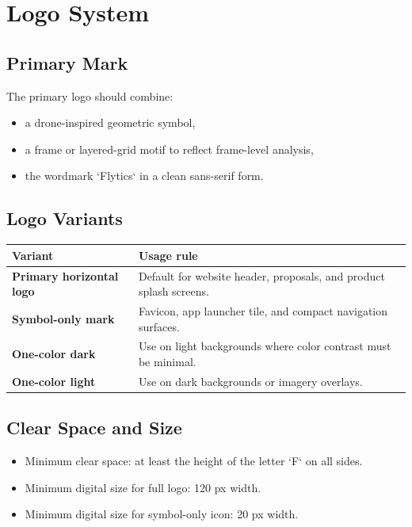 \documentclass[11pt,a4paper]{article}
\begin{document}
\section{Logo System}

\subsection{Primary Mark}

The primary logo should combine:

\begin{itemize}[leftmargin=*]
    \item a drone-inspired geometric symbol,
    \item a frame or layered-grid motif to reflect frame-level analysis,
    \item the wordmark `Flytics` in a clean sans-serif form.
\end{itemize}

\subsection{Logo Variants}

\begin{longtable}{>{\bfseries}p{}p{}}
\toprule
Variant & Usage rule \\
\midrule
Primary horizontal logo & Default for website header, proposals, and product splash screens. \\
Symbol-only mark & Favicon, app launcher tile, and compact navigation surfaces. \\
One-color dark & Use on light backgrounds where color contrast must be minimal. \\
One-color light & Use on dark backgrounds or imagery overlays. \\
\bottomrule
\end{longtable}

\subsection{Clear Space and Size}

\begin{itemize}[leftmargin=*]
    \item Minimum clear space: at least the height of the letter `F` on all sides.
    \item Minimum digital size for full logo: 120 px width.
    \item Minimum digital size for symbol-only icon: 20 px width.
\end{itemize}
\end{document}
